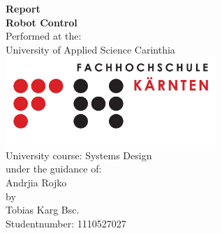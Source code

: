 \begin{titlepage}

\begin{center}

\textbf{\LARGE Report}\\[1.2cm]
\textbf{\LARGE Robot Control}\\[2.5cm]


Performed at the:\\
\large University of Applied Science Carinthia 
\includegraphics[width=0.60\textwidth]{pics/fh_logo}\\[0.0cm]    
\large University course: Systems Design\\[1cm]
\small under the guidance of:\\
\large Andrjia Rojko\\[2cm]

\normalsize
\large by\\[0.5cm]
Tobias Karg Bsc.\\[0.2cm]
Studentnumber: 1110527027\\[0.2cm]

\normalsize


\vfill


\end{center}

\end{titlepage}